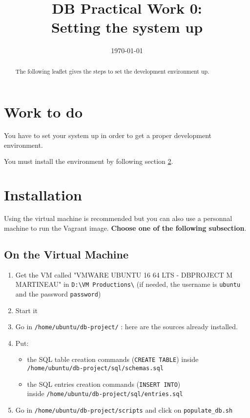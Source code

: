 \documentclass[twoside,a4paper,12pt]{article}
\title{DB Practical Work 0:\\Setting the system up}
\date{\today}
\begin{document}
\maketitle

\begin{abstract}
  The following leaflet gives the steps to set the development environment up.
\end{abstract}

\tableofcontents

\clearpage

\section{Work to do}
You have to set your system up in order to get a proper development environment.

You must install the environment by following section \ref{sec:installation}.

\section{Installation}
\label{sec:installation}

Using the virtual machine is recommended but you can also use a personnal machine to run the Vagrant image. \textbf{Choose one of the following subsection}.

\newpage
\subsection{On the Virtual Machine}
\begin{enumerate}
\item Get the VM called "VMWARE UBUNTU 16 64 LTS - DBPROJECT M MARTINEAU" in \texttt{D:\textbackslash VM Productions\textbackslash} (if needed, the username is \texttt{ubuntu} and the password \texttt{password})
\item Start it
\item Go in \texttt{/home/ubuntu/db-project/} : here are the sources already installed.
\item Put:
\begin{itemize}
	\item the SQL table creation commands (\texttt{CREATE TABLE}) inside\\ \texttt{/home/ubuntu/db-project/sql/schemas.sql}
	\item the SQL entries creation commands (\texttt{INSERT INTO})\\ inside \texttt{/home/ubuntu/db-project/sql/entries.sql}
\end{itemize}
\item Go in \texttt{/home/ubuntu/db-project/scripts} and click on \texttt{populate\_db.sh}
\end{enumerate}
\end{document}
